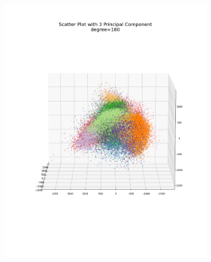 \documentclass[12pt, a4paper]{article}
\begin{document}
\begin{figure}[h]
\begin{subfigure}{0.3\linewidth}
        \includegraphics[width=\linewidth]{images/q4/a/projection_to_3d_with_angle180.png}
    \end{subfigure}
    \hfill
    \begin{subfigure}{0.3\linewidth}
        \centering

\end{subfigure}
\end{figure}
\end{document}
